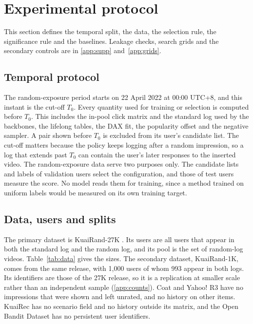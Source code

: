\section{Experimental protocol}
\label{sec:protocol}

This section defines the temporal split, the data, the selection rule, the significance rule and the baselines. Leakage checks,
search grids and the secondary controls are in \ref{app:supp} and~\ref{app:grids}.

\subsection{Temporal protocol}
\label{sec:protocol-temporal}

The random-exposure period starts on 22 April 2022 at 00:00 UTC+8, and this instant is the cut-off $T_0$. Every quantity used for training
or selection is computed before $T_0$. This includes the in-pool click matrix and the standard log used by the backbones, the lifelong
tables, the DAX fit, the popularity offset and the negative sampler. A pair shown before $T_0$ is excluded from its user's candidate list.
The cut-off matters because the policy keeps logging after a random impression, so a log that extends past $T_0$ can contain the user's
later responses to the inserted video. The random-exposure data serve two purposes only. The candidate lists and labels of validation users
select the configuration, and those of test users measure the score. No model reads them for training, since a method trained on uniform
labels would be measured on its own training target.

\subsection{Data, users and splits}
\label{sec:protocol-data}

The primary dataset is KuaiRand-27K \citep{gao2022kuairand}. Its users are all users that appear in both the standard log and the random log,
and its pool is the set of random-log videos. Table~\ref{tab:data} gives the sizes. The secondary dataset, KuaiRand-1K, comes from the same
release, with 1,000 users of whom 993 appear in both logs. Its identifiers are those of the 27K release, so it is a replication at smaller
scale rather than an independent sample (\ref{app:counts}). Coat \citep{schnabel2016} and Yahoo! R3 \citep{marlin2009collaborative} have no impressions that were shown and left unrated, and no history on other items. KuaiRec \citep{gao2022kuairec} has no scenario field and no history outside its matrix, and the Open Bandit Dataset \citep{saito2021obd} has no persistent user identifiers.

